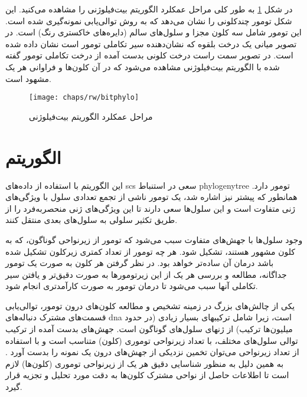 در شکل \ref{fig:ch_rw:bitphylo} به طور کلی مراحل عمکلرد الگوریتم بیت‌فیلوژنی را مشاهده می‌کنید. این شکل تومور چندکلونی  را نشان  می‌دهد که به روش توالی‌یابی نمونه‌گیری شده است. این تومور شامل سه کلون مجزا و سلول‌های سالم (دایره‌های  خاکستری رنگ) است. در تصویر میانی یک درخت بلقوه که نشان‌دهنده سیر تکاملی تومور است نشان داده شده است. در تصویر سمت راست درخت کلونی بدست آمده از درخت تکاملی تومور گفته شده با الگوریتم بیت‌فیلوژنی مشاهده می‌شود که در آن کلون‌ها و فراوانی هر یک مشهود است. 

\begin{figure}[!ht]
	\centerline{\texttt{[image: chaps/rw/bitphylo]}}
	\caption{مراحل عمکلرد الگوریتم بیت‌فیلوژنی}
	\label{fig:ch_rw:bitphylo}
\end{figure}


\section{الگوریتم  \cite{jahn2016tree}}

این الگوریتم با استفاده از داده‌های \gls{scs} سعی در استنباط \gls{phylogenytree} تومور دارد. همانطور که پیشتر نیز اشاره شد، یک تومور ناشی از تجمع تعدادی سلول با ویژگی‌های ژنی متفاوت است و این سلول‌ها سعی دارند تا این ویژگی‌های ژنی منحصربه‌فرد را از طریق تکثیر سلولی به سلول‌های بعدی منتقل کنند.  \cite{davis2016computing}

وجود سلول‌ها با جهش‌های متفاوت سبب می‌شود که تومور از زیرنواحی گوناگون، که به کلون مشهور هستند، تشکیل شود. هر چه تومور از تعداد کمتری زیرکلون تشکیل شده باشد درمان آن ساده‌تر خواهد بود. در نظر گرفتن هر کلون به صورت یک تومور جداگانه، مطالعه و بررسی هر یک از این زیرتومورها به صورت دقیق‌تر و یافتن سیر تکاملی آنها سبب می‌شود تا درمان تومور به صورت کارآمدتری انجام شود.  \cite{beerenwinkel2015cancer}

یکی از چالش‌های بزرگ در زمینه تشخیص و مطالعه کلون‌های درون تومور، توالی‌یابی قسمت‌های مشترک دنباله‌های \gls{dna} است، زیرا شامل ترکیبهای بسیار زیادی (در حدود میلیون‌ها ترکیب) از ژنهای سلول‌های گوناگون است. جهش‌های بدست آمده از ترکیب توالی سلول‌های مختلف، با تعداد زیرنواحی توموری (کلون) متناسب است و با استفاده از تعداد زیرنواحی می‌توان تخمین نزدیکی از جهش‌های درون یک نمونه را بدست آورد \cite{mcgranahan2017clonal}. به همین دلیل به منظور شناسایی دقیق هر یک از زیرنواحی توموری (کلون‌ها) لازم است تا اطلاعات حاصل از نواحی مشترک کلون‌ها به دقت مورد تحلیل و تجزیه قرار گیرد.  \cite{salehi2017ddclone}


